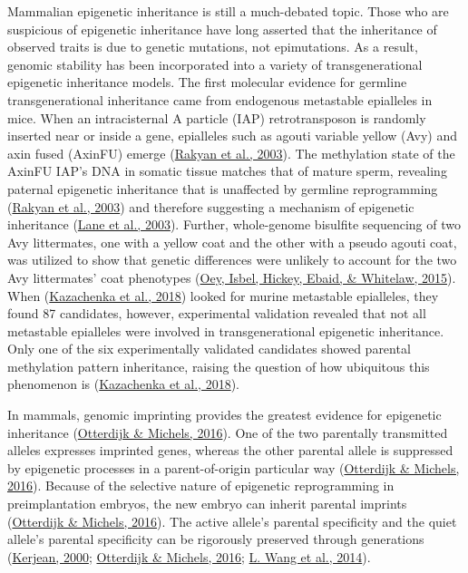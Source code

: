 \documentclass[12pt,twoside]{reedthesis}
\begin{document}
Mammalian epigenetic inheritance is still a much-debated topic. Those
who are suspicious of epigenetic inheritance have long asserted that the
inheritance of observed traits is due to genetic mutations, not
epimutations. As a result, genomic stability has been incorporated into
a variety of transgenerational epigenetic inheritance models. The first
molecular evidence for germline transgenerational inheritance came from
endogenous metastable epialleles in mice. When an intracisternal A
particle (IAP) retrotransposon is randomly inserted near or inside a
gene, epialleles such as agouti variable yellow (Avy) and axin fused
(AxinFU) emerge (\protect\hyperlink{ref-rakyan2003}{Rakyan et al., 2003}). The methylation state of the AxinFU IAP's
DNA in somatic tissue matches that of mature sperm, revealing paternal
epigenetic inheritance that is unaffected by germline reprogramming
(\protect\hyperlink{ref-rakyan2003}{Rakyan et al., 2003}) and therefore suggesting a mechanism of epigenetic
inheritance (\protect\hyperlink{ref-lane2003}{Lane et al., 2003}). Further, whole-genome bisulfite sequencing of
two Avy littermates, one with a yellow coat and the other with a pseudo
agouti coat, was utilized to show that genetic differences were unlikely
to account for the two Avy littermates' coat phenotypes (\protect\hyperlink{ref-oey2015}{Oey, Isbel, Hickey, Ebaid, \& Whitelaw, 2015}). When
(\protect\hyperlink{ref-kazachenka2018}{Kazachenka et al., 2018}) looked for murine metastable epialleles, they found 87
candidates, however, experimental validation revealed that not all
metastable epialleles were involved in transgenerational epigenetic
inheritance. Only one of the six experimentally validated candidates
showed parental methylation pattern inheritance, raising the question of
how ubiquitous this phenomenon is (\protect\hyperlink{ref-kazachenka2018}{Kazachenka et al., 2018}).

In mammals, genomic imprinting provides the greatest evidence for
epigenetic inheritance (\protect\hyperlink{ref-otterdijk2016}{Otterdijk \& Michels, 2016}). One of the two parentally
transmitted alleles expresses imprinted genes, whereas the other
parental allele is suppressed by epigenetic processes in a
parent-of-origin particular way (\protect\hyperlink{ref-otterdijk2016}{Otterdijk \& Michels, 2016}). Because of the
selective nature of epigenetic reprogramming in preimplantation embryos,
the new embryo can inherit parental imprints (\protect\hyperlink{ref-otterdijk2016}{Otterdijk \& Michels, 2016}). The
active allele's parental specificity and the quiet allele's parental
specificity can be rigorously preserved through generations
(\protect\hyperlink{ref-kerjean2000}{Kerjean, 2000}; \protect\hyperlink{ref-otterdijk2016}{Otterdijk \& Michels, 2016}; \protect\hyperlink{ref-wang2014}{L. Wang et al., 2014}).
\end{document}
